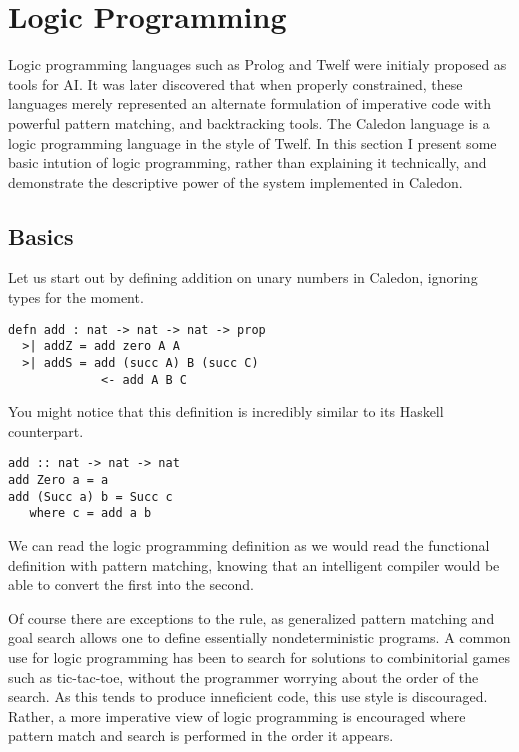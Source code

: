 \section{Logic Programming}

Logic programming languages such as Prolog and Twelf were initialy proposed as tools for AI.  
It was later discovered that when properly constrained, these languages merely represented an alternate
formulation of imperative code with powerful pattern matching, and backtracking tools.  The Caledon language
is a logic programming language in the style of Twelf.  In this section I present some basic intution of logic 
programming, rather than explaining it technically, and demonstrate the descriptive
power of the system implemented in Caledon.

\subsection{Basics}
Let us start out by defining addition on unary numbers in Caledon, ignoring types for the moment.

\begin{lstlisting}
defn add : nat -> nat -> nat -> prop
  >| addZ = add zero A A
  >| addS = add (succ A) B (succ C) 
             <- add A B C
\end{lstlisting}

You might notice that this definition is incredibly similar to its Haskell counterpart.

\begin{lstlisting}
add :: nat -> nat -> nat
add Zero a = a
add (Succ a) b = Succ c
   where c = add a b
\end{lstlisting}

We can read the logic programming definition as we would read the functional definition with pattern
matching, knowing that an intelligent compiler would be able to convert the first into the second.  

Of course there are exceptions to the rule, as generalized pattern matching and 
goal search allows one to define essentially nondeterministic programs.  A common use for logic programming
has been to search for solutions to combinitorial games such as tic-tac-toe, without the programmer worrying about the order
of the search.  As this tends to produce inneficient code, this use style is discouraged.  Rather, a more imperative 
view of logic programming is encouraged where pattern match and search is performed in the order it appears.  

